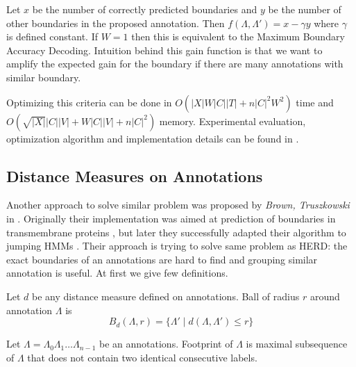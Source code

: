 Let $x$ be the number of correctly
predicted boundaries and $y$ be the number of other boundaries in the proposed
annotation. Then $f(\Lambda,\Lambda')=x-\gamma y$ where $\gamma$ is defined
constant. If $W=1$ then this is equivalent to the Maximum Boundary Accuracy
Decoding. Intuition behind this gain function is that we want to amplify the   
expected gain for the boundary if there are many annotations with similar
boundary.

Optimizing this criteria can be done in $O(|X|W|C||T| + n|C|^2W^2)$ time  and
$O(\sqrt{|X|}|C||V|+W|C||V|+n|C|^2)$ memory. Experimental evaluation,
optimization algorithm and implementation details can be found in
\cite{Nanasi2010,Nanasi2010mgr}.

\subsection{Distance Measures on Annotations}\label{SECTION:DISTANTMEASURES}

Another approach to solve similar problem was proposed by {\it Brown,
Truszkowski} in \cite{Brown2010}. Originally their implementation was aimed at
prediction of boundaries in transmembrane proteins \cite{Brown2010}, but later
they successfully adapted their algorithm to jumping HMMs \cite{Truszkowski2011}.
Their approach is trying to solve same problem as HERD: the exact boundaries of
an annotations are hard to find and grouping similar annotation is useful.
At first we give few definitions.

\begin{definition}
Let $d$ be any distance measure defined on annotations. Ball of radius $r$
around annotation $\Lambda$ is 
\begin{equation*}
B_d(\Lambda,r) = \{\Lambda'\mid d(\Lambda,\Lambda')\leq r\}
\end{equation*}
\end{definition}

\begin{definition}
Let $\Lambda=\Lambda_0\Lambda_1\dots\Lambda_{n-1}$ be an annotations. Footprint
of $\Lambda$ is maximal subsequence of $\Lambda$ that does not contain two
identical 
consecutive labels. \label{DEFINITION::FOOTPRINT}
\end{definition}

